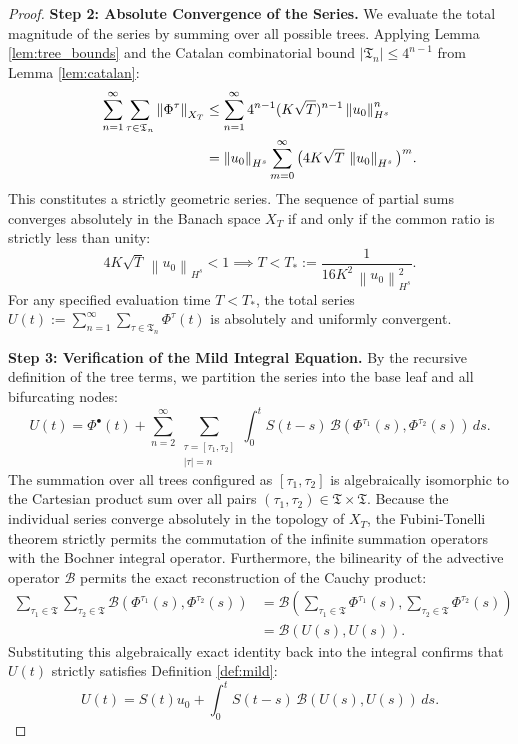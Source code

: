\documentclass[12pt,a4paper]{article}
\theoremstyle{plain}
\theoremstyle{definition}
\theoremstyle{remark}
\newcommand{\norm}[1]{\left\|#1\right\|}
\newcommand{\BB}{\mathcal{B}}
\newcommand{\fT}{\mathfrak{T}}
\begin{document}
\begin{proof}
\noindent\textbf{Step 2: Absolute Convergence of the Series.}
We evaluate the total magnitude of the series by summing over all possible trees. Applying Lemma \ref{lem:tree_bounds} and the Catalan combinatorial bound $|\fT_n| \le 4^{n-1}$ from Lemma \ref{lem:catalan}:
\begin{align}
  \sum_{n=1}^\infty \sum_{\tau\in\fT_n} \norm{\Phi^\tau}_{X_T} 
  &\le \sum_{n=1}^\infty 4^{n-1} (K\sqrt{T})^{n-1} \norm{u_0}_{H^s}^n \notag \\
  &= \norm{u_0}_{H^s} \sum_{m=0}^\infty \big(4K\sqrt{T}\,\norm{u_0}_{H^s}\big)^m.
  \label{eq:series_convergence}
\end{align}
This constitutes a strictly geometric series. The sequence of partial sums converges absolutely in the Banach space $X_T$ if and only if the common ratio is strictly less than unity:
\[
  4K\sqrt{T}\,\norm{u_0}_{H^s} < 1 \implies T < T_* := \frac{1}{16K^2\,\norm{u_0}_{H^s}^2}.
\]
For any specified evaluation time $T < T_*$, the total series $U(t) := \sum_{n=1}^\infty \sum_{\tau\in\fT_n} \Phi^\tau(t)$ is absolutely and uniformly convergent.

\noindent\textbf{Step 3: Verification of the Mild Integral Equation.}
By the recursive definition of the tree terms, we partition the series into the base leaf and all bifurcating nodes:
\[
  U(t) = \Phi^\bullet(t) + \sum_{n=2}^\infty \sum_{\substack{\tau=[\tau_1,\tau_2]\\|\tau|=n}} \int_0^t S(t-s)\,\BB(\Phi^{\tau_1}(s),\Phi^{\tau_2}(s))\,ds.
\]
The summation over all trees configured as $[\tau_1,\tau_2]$ is algebraically isomorphic to the Cartesian product sum over all pairs $(\tau_1, \tau_2) \in \fT \times \fT$. Because the individual series converge absolutely in the topology of $X_T$, the Fubini-Tonelli theorem strictly permits the commutation of the infinite summation operators with the Bochner integral operator. Furthermore, the bilinearity of the advective operator $\BB$ permits the exact reconstruction of the Cauchy product:
\begin{align*}
  \sum_{\tau_1 \in \fT} \sum_{\tau_2 \in \fT} \BB(\Phi^{\tau_1}(s),\Phi^{\tau_2}(s))
  &= \BB\left( \sum_{\tau_1 \in \fT} \Phi^{\tau_1}(s), \sum_{\tau_2 \in \fT} \Phi^{\tau_2}(s) \right) \\
  &= \BB(U(s), U(s)).
\end{align*}
Substituting this algebraically exact identity back into the integral confirms that $U(t)$ strictly satisfies Definition \ref{def:mild}:
\[
  U(t) = S(t)u_0 + \int_0^t S(t-s)\,\BB(U(s),U(s))\,ds.
\]


\end{proof}
\end{document}
